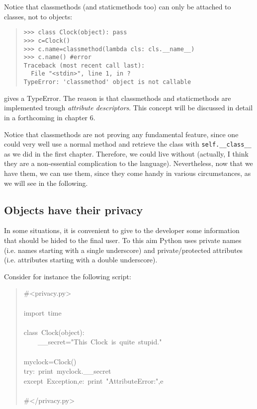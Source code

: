 \documentclass[10pt,english]{article}
\begin{document}
Notice that classmethods (and staticmethods too) 
can only be attached to classes, not to objects:
\begin{quote}
\begin{verbatim}>>> class Clock(object): pass
>>> c=Clock()
>>> c.name=classmethod(lambda cls: cls.__name__) 
>>> c.name() #error
Traceback (most recent call last):
  File "<stdin>", line 1, in ?
TypeError: 'classmethod' object is not callable\end{verbatim}
\end{quote}

gives a TypeError. The reason is that classmethods and staticmethods 
are implemented 
trough \emph{attribute descriptors}. This concept will be discussed in detail in a 
forthcoming in chapter 6.

Notice that classmethods are not proving any fundamental feature, since
one could very well use a normal method and retrieve the class with 
\texttt{self.{\_}{\_}class{\_}{\_}} as we did in the first chapter. 
Therefore, we could live without (actually, I think they are a non-essential
complication to the language).
Nevertheless, now that we have them, we can use them, since
they come handy in various circumstances, as we will see in the following.



\hypertarget{objects-have-their-privacy}{}
\subsection*{Objects have their privacy}

In some situations, it is convenient to give to the developer
some information that should be hided to the final user. To this
aim Python uses private names (i.e. names starting with a single
underscore) and private/protected attributes (i.e. attributes starting with
a double underscore).

Consider for instance the following script:
\begin{quote}
\begin{ttfamily}\begin{flushleft}
\mbox{{\#}<privacy.py>}\\
\mbox{}\\
\mbox{import~time}\\
\mbox{}\\
\mbox{class~Clock(object):}\\
\mbox{~~~~{\_}{\_}secret="This~Clock~is~quite~stupid."}\\
\mbox{}\\
\mbox{myclock=Clock()}\\
\mbox{try:~print~myclock.{\_}{\_}secret}\\
\mbox{except~Exception,e:~print~"AttributeError:",e}\\
\mbox{}\\
\mbox{{\#}</privacy.py>}
\end{flushleft}\end{ttfamily}
\end{quote}
\end{document}
